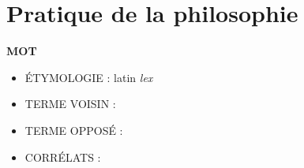 
\section{Pratique de la philosophie}

{\bf MOT}

\vspace{0.35cm}
%
\begin{itemize}[leftmargin=1cm, label=, itemsep=1pt]
\item {\footnotesize ÉTYMOLOGIE} : latin {\it lex}
\end{itemize}


\begin{itemize}[leftmargin=1cm, label=, itemsep=1pt]
\item {\footnotesize TERME VOISIN} : 
\item {\footnotesize TERME OPPOSÉ} : 
\item {\footnotesize CORRÉLATS} : 
\end{itemize}

